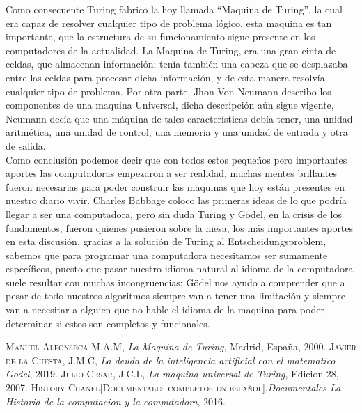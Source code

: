 \documentclass{article}
\begin{document}
Como consecuente Turing fabrico la hoy llamada “Maquina de Turing”, la cual era capaz de resolver cualquier tipo de problema lógico, esta maquina es tan importante, que la estructura de su funcionamiento sigue presente en los computadores de la actualidad. \cite{Jul} La Maquina de Turing, era una gran cinta de celdas, que almacenan información; tenía también una cabeza que se desplazaba entre las celdas para procesar dicha información, y de esta manera resolvía cualquier tipo de problema. Por otra parte, \cite{His}Jhon Von Neumann describo los componentes de una maquina Universal, dicha descripción aún sigue vigente, Neumann decía que una máquina de tales características debía tener, una unidad aritmética, una unidad de control, una memoria y una unidad de entrada y otra de salida.\\

Como conclusión podemos decir que con todos estos pequeños pero importantes aportes las computadoras empezaron a ser realidad, muchas mentes brillantes fueron necesarias para poder construir las maquinas que hoy están presentes en nuestro diario vivir. Charles Babbage coloco las primeras ideas de lo que podría llegar a ser una computadora, pero sin duda Turing y Gödel, en la crisis de los fundamentos, fueron quienes pusieron sobre la mesa, los más importantes aportes en esta discusión, gracias a la solución de Turing al Entscheidungsproblem, sabemos que para programar una computadora necesitamos ser sumamente específicos, puesto que pasar nuestro idioma natural al idioma de la computadora suele resultar con muchas incongruencias; Gödel nos ayudo a comprender que a pesar de todo nuestros algoritmos siempre van a tener una limitación y siempre van a necesitar a alguien que no hable el idioma de la maquina para poder determinar si estos son completos y funcionales.



\newpage


\begin{thebibliography}{X}
 \textsc{Manuel Alfonseca M.A.M},
\textit{La Maquina de Turing}, Madrid, España, 2000.
 \textsc{Javier de la Cuesta, J.M.C},\textit{ La deuda de la inteligencia artificial con el matematico Godel}, 2019.
 \textsc{Julio Cesar, J.C.L},\textit{ La maquina universal de Turing}, Edicion 28, 2007.
 \textsc{History Chanel[Documentales completos en español]},\textit{Documentales La Historia de la computacion y la computadora}, 2016.
\end{thebibliography}
\end{document}
